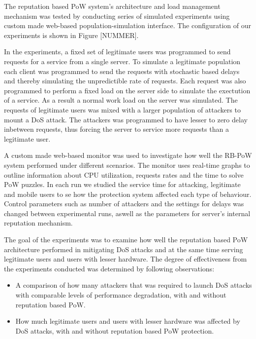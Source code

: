 The reputation based PoW system's architecture and load management mechanism was tested by conducting series of simulated experiments using custom made web-based population-simulation interface. The configuration of our experiments is shown in Figure [NUMMER].

In the experiments, a fixed set of legitimate users was programmed to send requests for a service from a single server. To simulate a legitimate population each client was programmed to send the requests with stochastic based delays and thereby simulating the unpredictible rate of requests. Each request was also programmed to perform a fixed load on the server side to simulate the exectution of a service. As a result a normal work load on the server was simulated. The requests of legitimate users was mixed with a larger population of attackers to mount a DoS attack. The attackers was programmed to have lesser to zero delay inbetween requests, thus forcing the server to service more requests than a legitimate user. 

A custom made web-based monitor was used to investigate how well the RB-PoW system performed under different scenarios. The monitor uses real-time graphs to outline information about CPU utilization, requests rates and the time to solve PoW puzzles. In each run we studied the service time for attacking, legitimate and mobile users to se how the protection system affected each type of behaviour. Control parameters such as number of attackers and the settings for delays was changed between experimental runs, aswell as the parameters for server's internal reputation mechanism.

The goal of the experiments was to examine how well the reputation based PoW architecture performed in mitigating DoS attacks and at the same time serving legitimate users and users with lesser hardware. The degree of effectiveness from the experiments conducted was determined by following observations:

\begin{itemize}
\item A comparison of how many attackers that was required to launch DoS attacks with comparable levels of performance degradation, with and without reputation based PoW.

\item How much legitimate users and users with lesser hardware was affected by DoS attacks, with and without reputation based PoW protection.
\end{itemize}

